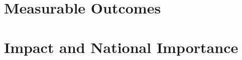 \documentclass[11pt,english,twocolumn]{article}
\begin{document}
\section{Measurable Outcomes}

\section{Impact and National Importance}

\let\oldbibliography\thebibliography
\renewcommand{\thebibliography}[1]{\oldbibliography{#1}
\setlength{\itemsep}{-3pt}}


{
\scriptsize

}
\end{document}
